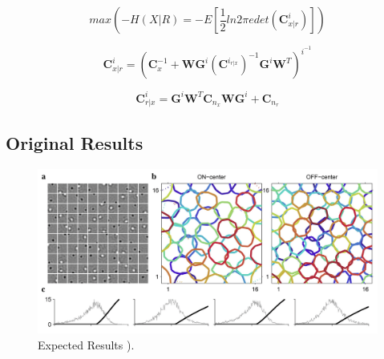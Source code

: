 \documentclass{article}
\begin{document}
$$ max(-H(X|R) = -E[\frac{1}{2} ln 2 \pi e det(\textbf{C}^i_{x|r})]) $$


$$ \textbf{C}^i_{x|r} = (\textbf{C}_{x}^{-1} + \textbf{W} \textbf{G}^i (\textbf{C}^{i_{r|x}})^{-1} \textbf{G}^i \textbf{W}^T )^{i^{-1}} $$


$$ \textbf{C}^i_{r|x} = \textbf{G}^i \textbf{W}^T \textbf{C}_{n_x} \textbf{W} \textbf{G}^i  + \textbf{C}_{n_r} $$




\subsection{Original Results}


\begin{figure}
  \centering
    \includegraphics[width=1\linewidth]{ksfig2.png}
  \caption{Expected Results {\cite{karksim11}}).}
  \label{fig:ksfig2}
\end{figure}
\end{document}

